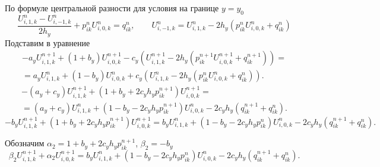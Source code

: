 \documentclass[a4paper,12pt]{article}
\begin{document}
По формуле центральной разности для условия на границе $y = y_0$
\begin{equation*}
  \frac{U^{n}_{i,1,k} -  U^{n}_{i,-1,k}}{2 h_y} + p_{ik}^n U^n_{i,0,k}  = q_{ik}^{n}, \qquad
  U^{n}_{i,-1,k}  = U^{n}_{i,1,k} - 2 h_y \left( p_{ik}^n U^n_{i,0,k} + q_{ik}^{n} \right)
\end{equation*}
Подставим в уравнение
\begin{multline*}
  - a_y U^{n+1}_{i,1,k} + \left( 1 + b_y \right) U^{n+1}_{i,0,k} - c_y \left( U^{n+1}_{i,1,k} - 2 h_y (p^{n+1}_{ik} U^{n+1}_{i,0,k} + q_{ik}^{n+1}) \right) = \\
  = a_y U^{n}_{i,1,k} + \left(1 - b_y \right) U^{n}_{i,0,k} + c_y \left(  U^{n}_{i,1,k} - 2 h_y (p^{n}_{ik} U^{n}_{i,0,k} + q_{ik}^{n}) \right).
\end{multline*}
\begin{multline*}
  - (a_y + c_y) U^{n+1}_{i,1,k} + \left( 1 + b_y + 2 c_y h_y p^{n+1}_{ik} \right) U^{n+1}_{i,0,k} = \\
  = (a_y + c_y) U^{n}_{i,1,k} + \left(1 - b_y - 2 c_y h_y p^{n+1}_{ik} \right) U^{n}_{i,0,k} - 2 c_y h_y (q_{ik}^{n+1} + q_{ik}^{n}).
\end{multline*}
\begin{equation}
  - b_y U^{n+1}_{i,1,k} + \left( 1 + b_y  + 2 c_y h_y p^{n+1}_{ik} \right) U^{n+1}_{i,0,k} =
  b_y U^{n}_{i,1,k} + \left(1 - b_y - 2 c_y h_y p^{n}_{ik} \right) U^{n}_{i,0,k} - 2 c_y h_y (q_{ik}^{n+1} + q_{ik}^{n}).
\end{equation}

Обозначим $\alpha_2 = 1 + b_y  + 2 c_y h_y p^{n+1}_{ik}$, $ \beta_2 = - b_y$
\begin{equation}
  \label{eq:3d-bc3-y0}
  \beta_2 U^{n+1}_{i,1,k} + \alpha_2 U^{n+1}_{i,0,k} =
  b_y U^{n}_{i,1,k} + \left(1 - b_y - 2 c_y h_y p^{n}_{ik} \right) U^{n}_{i,0,k} - 2 c_y h_y (q_{ik}^{n+1} + q_{ik}^{n}).
\end{equation}
\end{document}
